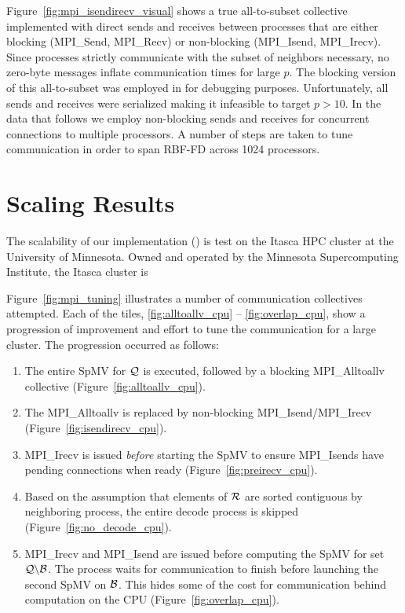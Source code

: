\documentclass{report}
\begin{document}
Figure~\ref{fig:mpi_isendirecv_visual} shows a true all-to-subset collective implemented with direct sends and receives between processes that are either blocking (MPI\_Send, MPI\_Recv) or non-blocking (MPI\_Isend, MPI\_Irecv). Since processes strictly communicate with the subset of neighbors necessary, no zero-byte messages inflate communication times for large $p$. 
The blocking version of this all-to-subset was employed in \cite{BolligFlyerErlebacher2012} for debugging purposes. Unfortunately, all sends and receives were serialized making it infeasible to target $p > 10$. In the data that follows we employ non-blocking sends and receives for concurrent connections to multiple processors. A number of steps are taken to tune communication in order to span RBF-FD across 1024 processors.


\section{Scaling Results} 

The scalability of our implementation (\cite{BolligFlyerErlebacher2012}) is test on the Itasca HPC cluster at the University of Minnesota. Owned and operated by the Minnesota Supercomputing Institute, the Itasca cluster is 

Figure~\ref{fig:mpi_tuning} illustrates a number of communication collectives attempted. Each of the tiles, \ref{fig:alltoallv_cpu} -- \ref{fig:overlap_cpu}, show a progression of improvement and effort to tune the communication for a large cluster. The progression occurred as follows:  
\begin{enumerate} 
\item The entire SpMV for $\mathcal{Q}$ is executed, followed by a blocking MPI\_Alltoallv collective (Figure~\ref{fig:alltoallv_cpu}).
\item The MPI\_Alltoallv is replaced by non-blocking MPI\_Isend/MPI\_Irecv (Figure~\ref{fig:isendirecv_cpu}).
\item MPI\_Irecv is issued \emph{before} starting the SpMV to ensure MPI\_Isends have pending connections when ready (Figure~\ref{fig:preirecv_cpu}). 
\item Based on the assumption that elements of $\mathcal{R}$ are sorted contiguous by neighboring process, the entire decode process is skipped (Figure~\ref{fig:no_decode_cpu}). 
\item MPI\_Irecv and MPI\_Isend are issued before computing the SpMV for set $\mathcal{Q} \backslash \mathcal{B}$. The process waits for communication to finish before launching the second SpMV on $\mathcal{B}$. This hides some of the cost for communication behind computation on the CPU (Figure~\ref{fig:overlap_cpu}). 
\end{enumerate}
\end{document}
